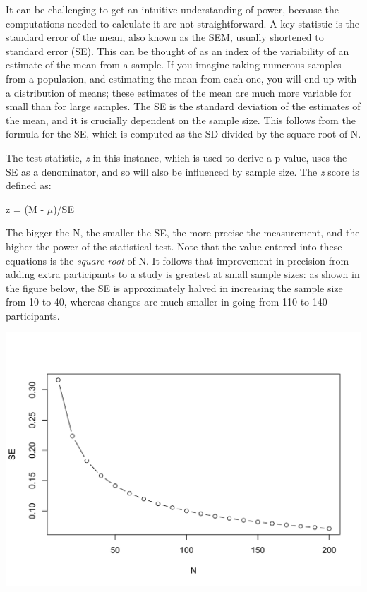 \documentclass{krantz}
\begin{document}
\begin{tcolorbox}[enhanced,colback=Black!5!lightgray,colframe=black!75!black,coltitle=white,title=Standard error of the mean]
It can be challenging to get an intuitive understanding of power, because the computations needed to calculate it are not straightforward. A key statistic is the standard error of the mean, also known as the SEM, usually shortened to standard error (SE). This can be thought of as an index of the variability of an estimate of the mean from a sample. If you imagine taking numerous samples from a population, and estimating the mean from each one, you will end up with a distribution of means; these estimates of the mean are much more variable for small than for large samples. The SE is the standard deviation of the estimates of the mean, and it is crucially dependent on the sample size.
This follows from the formula for the SE, which is computed as the SD divided by the square root of N.

The test statistic, \emph{z} in this instance, which is used to derive a p-value, uses the SE as a denominator, and so will also be influenced by sample size. The \emph{z} score is defined as:

z = (M - \(\mu\))/SE

The bigger the N, the smaller the SE, the more precise the measurement, and the higher the power of the statistical test. Note that the value entered into these equations is the \emph{square root} of N. It follows that improvement in precision from adding extra participants to a study is greatest at small sample sizes: as shown in the figure below, the SE is approximately halved in increasing the sample size from 10 to 40, whereas changes are much smaller in going from 110 to 140 participants.

\includegraphics[width=0.6\linewidth]{images_bw/demoSE}\label{SEMbyN}
\end{tcolorbox}
\end{document}
